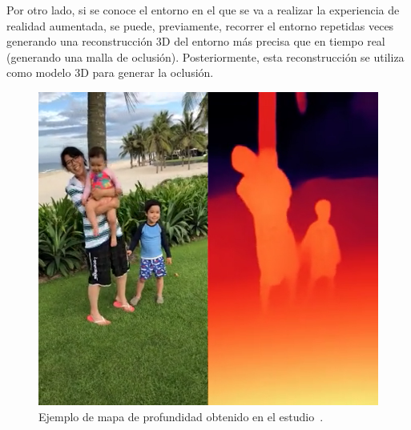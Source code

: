 Por otro lado, si se conoce el entorno en el que se va a realizar la experiencia de realidad aumentada, se puede, previamente, recorrer el entorno repetidas veces generando una reconstrucción 3D del entorno más precisa que en tiempo real (generando una malla de oclusión). Posteriormente, esta reconstrucción se utiliza como modelo 3D para generar la oclusión.\\

\begin{figure}[H]
    \centering
    \includegraphics[scale=0.4]{Images/Estado del arte/depthDiferido.png}
    \caption{Ejemplo de mapa de profundidad obtenido en el estudio~\cite{oclusionEnDiferido}.}
    \label{fig:depthDiferido}
\end{figure}
